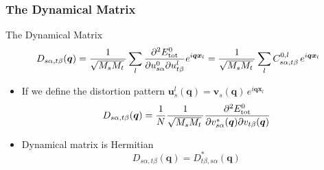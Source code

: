 \begin{frame}
  \frametitle{The Dynamical Matrix}
  The Dynamical Matrix
  \begin{equation*}
    \mathcolor{black}{
      D_{s\alpha,t\beta}(\boldsymbol{q})
    }
    =
    {1\over\sqrt{M_sM_t}\,}
    \mathcolor{black}{\sum_l}
    \mathcolor{black}{
      \frac{
      \partial^2 E^0_{\text{tot}}
      }{
      \partial {u}_{s\alpha}^0
      \partial {u}_{t\beta}^l
      }
      e^{i\boldsymbol{q}\boldsymbol{x}_l}
    }
    =
    {1\over\sqrt{M_sM_t}\,}
    \sum_l
    C_{s\alpha,t\beta}^{0, l}\,
    e^{i\boldsymbol{q}\boldsymbol{x}_l}
  \end{equation*}

  \begin{itemize}
  \item
    If we define the distortion pattern $\boldsymbol{u}^l_{s}(\boldsymbol{q}) =
    \boldsymbol{v}_{s}(\boldsymbol{q})\, e^{i\boldsymbol{q}\boldsymbol{x}_l}$
    \begin{equation*}
      D_{s\alpha,t\beta}(\boldsymbol{q})
      =
      {1 \over N}
      {1\over\sqrt{M_sM_t}\,}
      \frac{
      \partial^2 E^0_{\text{tot}}
      }{
      \partial {v}^*_{s\alpha}(\boldsymbol{q})
      \partial {v}_{t\beta}(\boldsymbol{q})
      }
    \end{equation*}
      
  \item Dynamical matrix is Hermitian
    \begin{equation*}
      D_{s\alpha,t\beta}(\boldsymbol{q})
      =
      D^*_{t\beta,s\alpha}(\boldsymbol{q})
    \end{equation*}
    

\end{itemize}
\end{frame}
